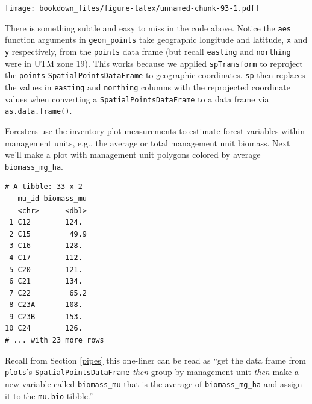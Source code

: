 \documentclass[]{krantz}
\makeatletter
\newenvironment{Shaded}{\begin{snugshade}}{\end{snugshade}}
\newcommand{\DataTypeTok}[1]{\textcolor[rgb]{0.27,0.27,0.27}{#1}}
\newcommand{\KeywordTok}[1]{\textcolor[rgb]{0.27,0.27,0.27}{\textbf{#1}}}
\newcommand{\NormalTok}[1]{#1}
\newcommand{\OperatorTok}[1]{\textcolor[rgb]{0.43,0.43,0.43}{\textbf{#1}}}
\newcommand{\StringTok}[1]{\textcolor[rgb]{0.5,0.5,0.5}{#1}}
\newenvironment{kframe}{%
\medskip{}
\setlength{\fboxsep}{.8em}
 \def\at@end@of@kframe{}%
 \ifinner\ifhmode%
  \def\at@end@of@kframe{\end{minipage}}%
  \begin{minipage}{\columnwidth}%
 \fi\fi%
 \def\FrameCommand##1{\hskip\@totalleftmargin \hskip-\fboxsep
 \colorbox{shadecolor}{##1}\hskip-\fboxsep
     \hskip-\linewidth \hskip-\@totalleftmargin \hskip\columnwidth}%
 \MakeFramed {\advance\hsize-\width
   \@totalleftmargin\z@ \linewidth\hsize
   \@setminipage}}%
 {\par\unskip\endMakeFramed%
 \at@end@of@kframe}
\renewenvironment{Shaded}{\begin{kframe}}{\end{kframe}}
\makeatother
\begin{document}
\texttt{[image: bookdown\_files/figure-latex/unnamed-chunk-93-1.pdf]}

There is something subtle and easy to miss in the code above. Notice the \texttt{aes} function arguments in \texttt{geom\_points} take geographic longitude and latitude, \texttt{x} and \texttt{y} respectively, from the \texttt{points} data frame (but recall \texttt{easting} and \texttt{northing} were in UTM zone 19). This works because we applied \texttt{spTransform} to reproject the \texttt{points} \texttt{SpatialPointsDataFrame} to geographic coordinates. \texttt{sp} then replaces the values in \texttt{easting} and \texttt{northing} columns with the reprojected coordinate values when converting a \texttt{SpatialPointsDataFrame} to a data frame via \texttt{as.data.frame()}.

Foresters use the inventory plot measurements to estimate forest variables within management units, e.g., the average or total management unit biomass. Next we'll make a plot with management unit polygons colored by average \texttt{biomass\_mg\_ha}.

\begin{Shaded}
\end{Shaded}

\begin{verbatim}
# A tibble: 33 x 2
   mu_id biomass_mu
   <chr>      <dbl>
 1 C12        124. 
 2 C15         49.9
 3 C16        128. 
 4 C17        112. 
 5 C20        121. 
 6 C21        134. 
 7 C22         65.2
 8 C23A       108. 
 9 C23B       153. 
10 C24        126. 
# ... with 23 more rows
\end{verbatim}

Recall from Section \ref{pipes} this one-liner can be read as ``get the data frame from \texttt{plots}'s \texttt{SpatialPointsDataFrame} \emph{then} group by management unit \emph{then} make a new variable called \texttt{biomass\_mu} that is the average of \texttt{biomass\_mg\_ha} and assign it to the \texttt{mu.bio} tibble.''
\end{document}
